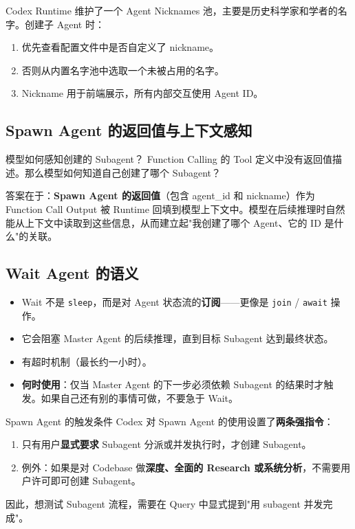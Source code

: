 Codex Runtime 维护了一个 Agent Nicknames 池，主要是历史科学家和学者的名字。创建子 Agent 时：
\begin{enumerate}
    \item 优先查看配置文件中是否自定义了 nickname。
    \item 否则从内置名字池中选取一个未被占用的名字。
    \item Nickname 用于前端展示，所有内部交互使用 Agent ID。
\end{enumerate}

\subsection{Spawn Agent 的返回值与上下文感知}

\begin{knowledgebox}{模型如何感知创建的 Subagent？}
Function Calling 的 Tool 定义中没有返回值描述。那么模型如何知道自己创建了哪个 Subagent？

答案在于：\textbf{Spawn Agent 的返回值}（包含 agent\_id 和 nickname）作为 Function Call Output 被 Runtime 回填到模型上下文中。模型在后续推理时自然能从上下文中读取到这些信息，从而建立起"我创建了哪个 Agent、它的 ID 是什么"的关联。
\end{knowledgebox}

\subsection{Wait Agent 的语义}

\begin{itemize}
    \item Wait 不是 \texttt{sleep}，而是对 Agent 状态流的\textbf{订阅}——更像是 \texttt{join} / \texttt{await} 操作。
    \item 它会阻塞 Master Agent 的后续推理，直到目标 Subagent 达到最终状态。
    \item 有超时机制（最长约一小时）。
    \item \textbf{何时使用}：仅当 Master Agent 的下一步必须依赖 Subagent 的结果时才触发。如果自己还有别的事情可做，不要急于 Wait。
\end{itemize}

\begin{importantbox}{Spawn Agent 的触发条件}
Codex 对 Spawn Agent 的使用设置了\textbf{两条强指令}：
\begin{enumerate}
    \item 只有用户\textbf{显式要求} Subagent 分派或并发执行时，才创建 Subagent。
    \item 例外：如果是对 Codebase 做\textbf{深度、全面的 Research 或系统分析}，不需要用户许可即可创建 Subagent。
\end{enumerate}
因此，想测试 Subagent 流程，需要在 Query 中显式提到"用 subagent 并发完成"。
\end{importantbox}

